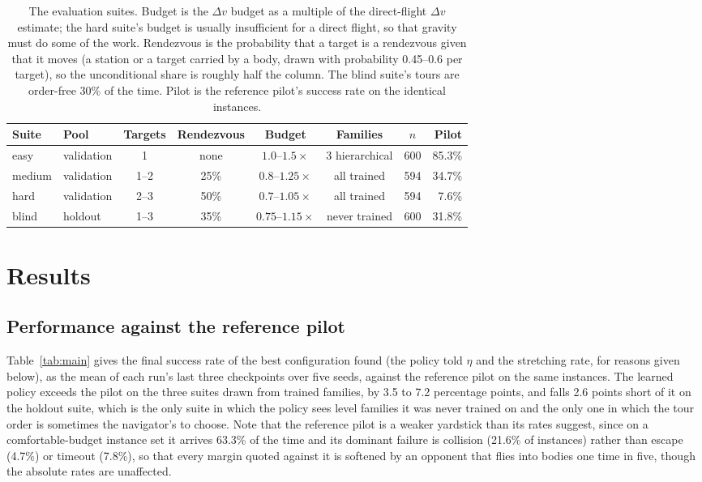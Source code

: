 \documentclass[11pt]{article}
\begin{document}
\begin{table}[t]
\centering
\small
\begin{tabular}{llcccccr}
\toprule
Suite & Pool & Targets & Rendezvous & Budget & Families & $n$ & Pilot \\
\midrule
easy   & validation & 1   & none      & $1.0$--$1.5\times$  & 3 hierarchical & 600 & 85.3\% \\
medium & validation & 1--2 & 25\%     & $0.8$--$1.25\times$ & all trained    & 594 & 34.7\% \\
hard   & validation & 2--3 & 50\%     & $0.7$--$1.05\times$ & all trained    & 594 & 7.6\% \\
blind  & holdout    & 1--3 & 35\%     & $0.75$--$1.15\times$ & never trained & 600 & 31.8\% \\
\bottomrule
\end{tabular}
\caption{The evaluation suites. Budget is the $\Delta v$ budget as a multiple of the
direct-flight $\Delta v$ estimate; the hard suite's budget is usually
insufficient for a direct flight, so that gravity must do some of the work.
Rendezvous is the probability that a target is a rendezvous given that it
moves (a station or a target carried by a body, drawn with probability
0.45--0.6 per target), so the unconditional share is roughly half the column.
The blind suite's tours are order-free 30\% of the time. Pilot is the
reference pilot's success rate on the identical instances.}
\label{tab:suites}
\end{table}

\section{Results}
\label{sec:results}

\subsection{Performance against the reference pilot}

Table~\ref{tab:main} gives the final success rate of the best configuration
found (the policy told $\eta$ and the stretching rate, for reasons given
below), as the mean of each run's last three checkpoints over five seeds,
against the reference pilot on the same instances. The learned policy
exceeds the pilot on the three suites drawn from trained families, by 3.5 to
7.2 percentage points, and falls 2.6 points short of it on the holdout suite,
which is the only suite in which the policy sees level families it was never
trained on and the only one in which the tour order is sometimes the
navigator's to choose. Note that the reference pilot is a weaker yardstick
than its rates suggest, since on a comfortable-budget instance set it arrives
63.3\% of the time and its dominant failure is collision (21.6\% of
instances) rather than escape (4.7\%) or timeout (7.8\%), so that
every margin quoted against it is softened by an opponent that flies into
bodies one time in five, though the absolute rates are unaffected.
\end{document}

